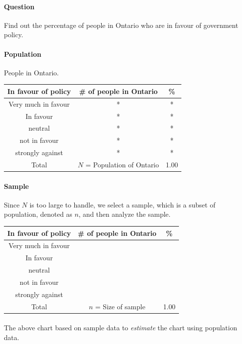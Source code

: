 \documentclass[11pt]{article}
\begin{document}
	\paragraph{Question} Find out the percentage of people in Ontario who are in favour of government policy.
	
	\paragraph{Population} People in Ontario.
	\begin{center}
		\begin{tabular}{|c|c|c|}
			\hline 
			In favour of policy & \# of people in Ontario & \% \\
			\hline \hline
			Very much in favour & * & * \\
			In favour & * & * \\
			neutral & * & * \\
			not in favour & * & * \\
			strongly against & * & * \\
			\hline
			Total & $N$ = Population of Ontario & 1.00 \\
			\hline
		\end{tabular}
	\end{center}
	\paragraph{Sample} Since $N$ is too large to handle, we select a sample, which is a subset of population, denoted as $n$, and then analyze the sample.
	
	\begin{center}
		\begin{tabular}{|c|c|c|}
			\hline 
			In favour of policy & \# of people in Ontario & \% \\
			\hline \hline
			Very much in favour & & \\
			In favour & &\\
			neutral & & \\
			not in favour & & \\
			strongly against & & \\
			\hline
			Total & $n$ = Size of sample & 1.00 \\
			\hline
		\end{tabular}
	\end{center}
	\paragraph{} The above chart based on sample data to \emph{estimate} the chart using population data. 
	
\end{document}
